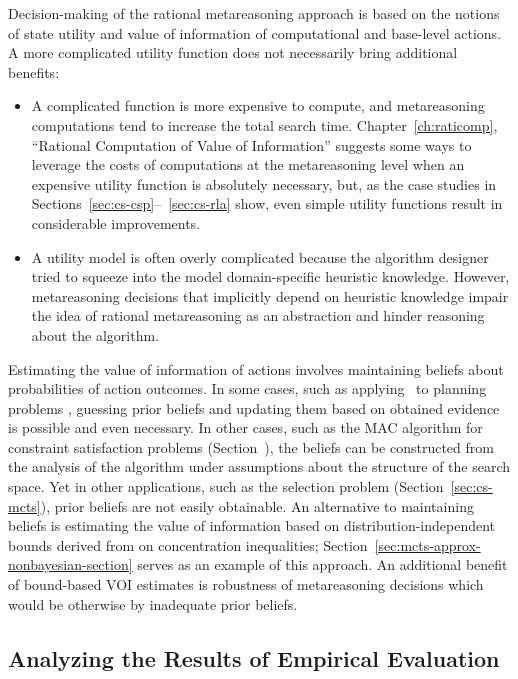 Decision-making of the rational metareasoning approach is based on the
notions of state utility and value of information of computational and
base-level actions. A more complicated utility function does not necessarily
bring additional  benefits:
\begin{itemize}
\item A complicated function is more expensive to compute, and
  metareasoning computations tend to increase the total search
  time.  Chapter~\ref{ch:raticomp}, ``Rational Computation of Value of
  Information'' suggests some ways to leverage the costs of
  computations at the metareasoning level when an expensive utility
  function is absolutely necessary, but, as the case studies in
  Sections~\ref{sec:cs-csp}--~\ref{sec:cs-rla} show, even simple utility
  functions result in considerable improvements.
\item A utility model is often overly complicated because the
  algorithm designer tried to squeeze into the model domain-specific
  heuristic knowledge. However, metareasoning decisions
  that implicitly depend on heuristic knowledge impair the idea of
  rational metareasoning as an abstraction and hinder reasoning about
  the algorithm.
\end{itemize}

Estimating the value of information of actions involves maintaining
beliefs about probabilities of action outcomes. In some cases, such as
applying \rationallazyastar~to planning problems
\cite{TolpinEtAl.rla}, guessing prior beliefs and updating them based
on obtained evidence is possible and even necessary. In other cases,
such as the MAC algorithm for constraint satisfaction problems
(Section~\label{sec:cs-csp}), the beliefs can be constructed from the
analysis of the algorithm under assumptions about the structure of the
search space. Yet in other applications, such as the selection problem
(Section~\ref{sec:cs-mcts}), prior beliefs are not easily obtainable. An
alternative to maintaining beliefs is estimating the value of
information based on distribution-independent bounds derived from on
concentration inequalities;
Section~\ref{sec:mcts-approx-nonbayesian-section} serves as an example  
of this approach. An additional benefit of bound-based VOI estimates 
is robustness of metareasoning decisions which would be otherwise
by inadequate prior beliefs. 

\subsection{Analyzing the Results of Empirical Evaluation}

